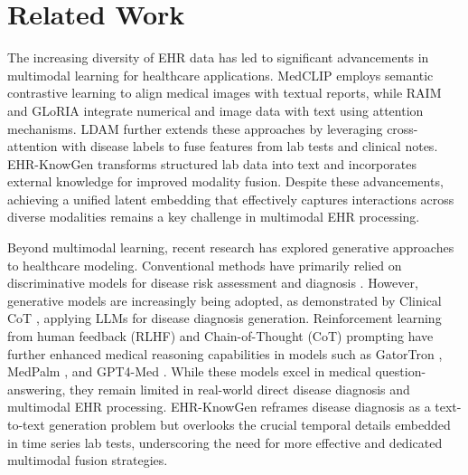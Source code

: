 \section{Related Work}
The increasing diversity of EHR data has led to significant advancements in multimodal learning for healthcare applications. MedCLIP \cite{wang2022medclip} employs semantic contrastive learning to align medical images with textual reports, while RAIM \cite{qiao2019mnn} and GLoRIA \cite{huang2021gloria} integrate numerical and image data with text using attention mechanisms. LDAM \cite{niu2021label} further extends these approaches by leveraging cross-attention with disease labels to fuse features from lab tests and clinical notes. EHR-KnowGen \cite{niu2024ehr} transforms structured lab data into text and incorporates external knowledge for improved modality fusion. Despite these advancements, achieving a unified latent embedding that effectively captures interactions across diverse modalities remains a key challenge in multimodal EHR processing.

Beyond multimodal learning, recent research has explored generative approaches to healthcare modeling. Conventional methods have primarily relied on discriminative models for disease risk assessment and diagnosis \cite{choi2016retain,niu2021lerp,qiao2019mnn}. However, generative models are increasingly being adopted, as demonstrated by Clinical CoT \cite{kwon2024large}, applying LLMs for disease diagnosis generation. Reinforcement learning from human feedback (RLHF) \cite{ouyang2022training} and Chain-of-Thought (CoT) prompting \cite{wei2022chain} have further enhanced medical reasoning capabilities in models such as GatorTron \cite{yang2022large}, MedPalm \cite{singhal2023large}, and GPT4-Med \cite{nori2023capabilities}. While these models excel in medical question-answering, they remain limited in real-world direct disease diagnosis and multimodal EHR processing. EHR-KnowGen \cite{niu2024ehr} reframes disease diagnosis as a text-to-text generation problem but overlooks the crucial temporal details embedded in time series lab tests, underscoring the need for more effective and dedicated multimodal fusion strategies.

%